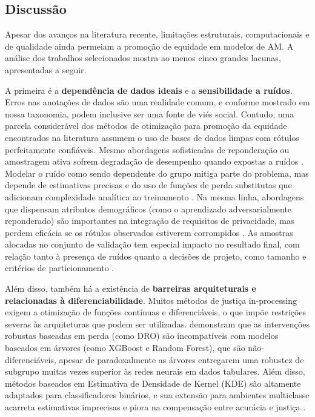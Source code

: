 \subsection{Discussão}\label{sec:desafios_otim}

Apesar dos avanços na literatura recente, limitações estruturais, computacionais e de qualidade ainda permeiam a promoção de equidade em modelos de AM. A análise dos trabalhos selecionados mostra ao menos cinco grandes lacunas, apresentadas a seguir.

A primeira é a \textbf{dependência de dados ideais} e a  \textbf{sensibilidade a ruídos}. Erros nas anotações de dados são uma realidade comum, e conforme mostrado em nossa taxonomia, podem inclusive ser uma fonte de viés social. Contudo, uma parcela considerável dos métodos de otimização para promoção da equidade encontrados na literatura assumem o uso de bases de dados limpas com rótulos perfeitamente confiáveis. Mesmo abordagens sofisticadas de reponderação ou amostragem ativa sofrem degradação de desempenho quando expostas a ruídos \cite{pang2024fairness}. Modelar o ruído como sendo dependente do grupo mitiga parte do problema, mas depende de estimativas precisas e do uso de funções de perda substitutas que adicionam complexidade analítica ao treinamento \cite{wang2021fair}. Na mesma linha, abordagens que dispensam atributos demográficos (como o aprendizado adversarialmente reponderado) são importantes na integração de requisitos de privacidade, mas perdem eficácia se os rótulos observados estiverem corrompidos \cite{lahoti2020fairness}. As amostras alocadas no conjunto de validação tem especial impacto no resultado final, com relação tanto à presença de ruídos quanto a decisões de projeto, como tamanho e critérios de particionamento \cite{abernethy2020active}.

Além disso, também há a existência de \textbf{barreiras arquiteturais e relacionadas à diferenciabilidade}. Muitos métodos de justiça in-processing exigem a otimização de funções contínuas e diferenciáveis, o que impõe restrições severas às arquiteturas que podem ser utilizadas. \citet{gardner2022subgroup} demonstram que as intervenções robustas baseadas em perda (como DRO) são incompatíveis com modelos baseados em árvores (como XGBoost e Random Forest), que são não-diferenciáveis, apesar de paradoxalmente as árvores entregarem uma robustez de subgrupo muitas vezes superior às redes neurais em dados tabulares. Além disso, métodos baseados em Estimativa de Densidade de Kernel (KDE) são altamente adaptados para classificadores binários, e sua extensão para ambientes multiclasse acarreta estimativas imprecisas e piora na compensação entre acurácia e justiça \cite{cho2020fair}.

